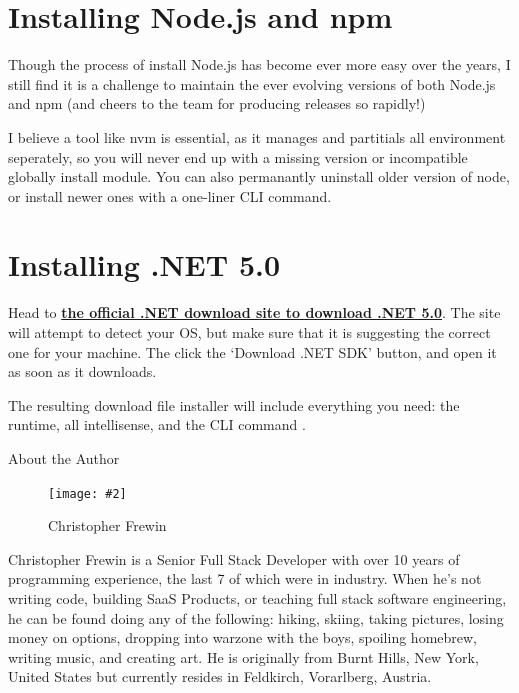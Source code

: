 \documentclass[paper=6in:9in,pagesize=pdftex,headinclude=on,footinclude=on,12pt,twoside]{scrbook}
\newcommand{\link}[2]{\textbf{\textcolor{monokaiPink}{\href{#2}{#1}}}}
\newcommand{\standardfigure}[3]{\begin{figure}[H]\begin{center}\texttt{[image: \#2]}\caption{#3}\label{fig:#2}\end{center}\end{figure}}
\begin{document}
\begin{appendices}
\chapter{Installing Node.js and npm}

Though the process of install Node.js has become ever more easy over the years, I still find it is a challenge to maintain the ever evolving versions of both Node.js and npm (and cheers to the team for producing releases so rapidly!)

I believe a tool like nvm is essential, as it manages and partitials all environment seperately, so you will never end up with a missing version or incompatible globally install module. You can also permanantly uninstall older version of node, or install newer ones with a one-liner CLI command.

\chapter{Installing .NET 5.0}

Head to \link{the official .NET download site to download .NET 5.0}{https://dotnet.microsoft.com/download}. The site will attempt to detect your OS, but make sure that it is suggesting the correct one for your machine. The click the `Download .NET SDK' button, and open it as soon as it downloads.

The resulting download file installer will include everything you need: the runtime, all intellisense, and the CLI command .

\end{appendices}

\printindex
{}

About the Author

\standardfigure{\textwidth/2}{about/avatar}{Christopher Frewin}

Christopher Frewin is a Senior Full Stack Developer with over 10 years of programming experience, the last 7 of which were in industry. When he's not writing code, building SaaS Products, or teaching full stack software engineering, he can be found doing any of the following: hiking, skiing, taking pictures, losing money on options, dropping into warzone with the boys, spoiling homebrew, writing music, and creating art. He is originally from Burnt Hills, New York, United States but currently resides in Feldkirch, Vorarlberg, Austria.
\end{document}
